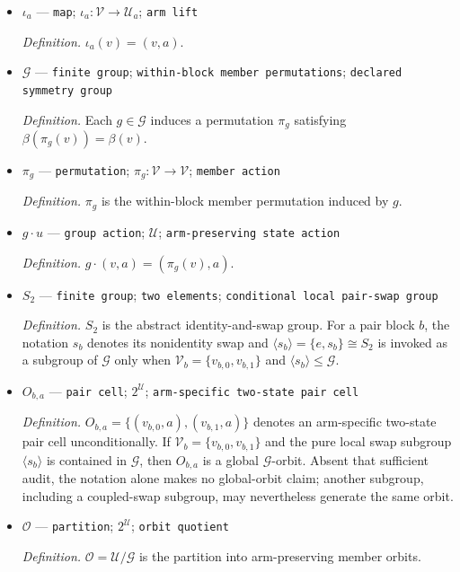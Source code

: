 \documentclass{article}
\begin{document}
\begin{itemize}
  \item \(\iota_a\) --- \texttt{map}; \(\iota_a:\mathcal V\to\mathcal U_a\); \texttt{arm lift}
  \par\smallskip\noindent\emph{Definition.} \(\iota_a(v)=(v,a)\).
  \item \(\mathcal G\) --- \texttt{finite group}; \texttt{within-\allowbreak{}block member permutations}; \texttt{declared symmetry group}
  \par\smallskip\noindent\emph{Definition.} Each \(g\in\mathcal G\) induces a permutation \(\pi_g\) satisfying \(\beta(\pi_g(v))=\beta(v)\).
  \item \(\pi_g\) --- \texttt{permutation}; \(\pi_g:\mathcal V\to\mathcal V\); \texttt{member action}
  \par\smallskip\noindent\emph{Definition.} \(\pi_g\) is the within-block member permutation induced by \(g\).
  \item \(g\cdot u\) --- \texttt{group action}; \(\mathcal U\); \texttt{arm-\allowbreak{}preserving state action}
  \par\smallskip\noindent\emph{Definition.} \(g\cdot(v,a)=(\pi_g(v),a)\).
  \item \(S_2\) --- \texttt{finite group}; \texttt{two elements}; \texttt{conditional local pair-\allowbreak{}swap group}
  \par\smallskip\noindent\emph{Definition.} \(S_2\) is the abstract identity-and-swap group. For a pair block \(b\), the notation \(s_b\) denotes its nonidentity swap and \(\langle s_b\rangle=\{e,s_b\}\cong S_2\) is invoked as a subgroup of \(\mathcal G\) only when \(\mathcal V_b=\{v_{b,0},v_{b,1}\}\) and \(\langle s_b\rangle\le\mathcal G\).
  \item \(O_{b,a}\) --- \texttt{pair cell}; \(2^{\mathcal U}\); \texttt{arm-\allowbreak{}specific two-\allowbreak{}state pair cell}
  \par\smallskip\noindent\emph{Definition.} \(O_{b,a}=\{(v_{b,0},a),(v_{b,1},a)\}\) denotes an arm-specific two-state pair cell unconditionally. If \(\mathcal V_b=\{v_{b,0},v_{b,1}\}\) and the pure local swap subgroup \(\langle s_b\rangle\) is contained in \(\mathcal G\), then \(O_{b,a}\) is a global \(\mathcal G\)-orbit. Absent that sufficient audit, the notation alone makes no global-orbit claim; another subgroup, including a coupled-swap subgroup, may nevertheless generate the same orbit.
  \item \(\mathcal O\) --- \texttt{partition}; \(2^{\mathcal U}\); \texttt{orbit quotient}
  \par\smallskip\noindent\emph{Definition.} \(\mathcal O=\mathcal U/\mathcal G\) is the partition into arm-preserving member orbits.

\end{itemize}
\end{document}
